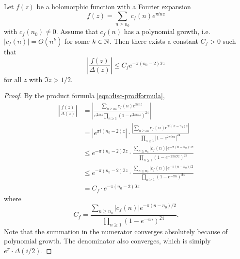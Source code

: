 \begin{lemma}\label{lemma:mod-div-disc-bound}\leanok
Let $f(z)$ be a holomorphic function with a Fourier expansion
\begin{equation}
    f(z) = \sum_{n \ge n_0} c_f(n) e^{\pi i n z}
\end{equation}
with $c_f(n_0) \ne 0$.
Assume that $c_f(n)$ has a polynomial growth, i.e. $|c_f(n)| = O(n^k)$ for some $k \in \mathbb{N}$.
Then there exists a constant $C_f > 0$ such that
\begin{equation}
    \left|\frac{f(z)}{\Delta(z)}\right| \le C_f e^{-\pi (n_0 - 2) \Im z}
\end{equation}
for all $z$ with $\Im z > 1/2$.
\end{lemma}
\begin{proof}\leanok
By the product formula \eqref{eqn:disc-prodformula},
\begin{align}
    \left|\frac{f(z)}{\Delta(z)}\right| &= \left|\frac{\sum_{n \ge n_0} c_f(n) e^{\pi i n z}}{e^{2 \pi i z}\prod_{n \ge 1} (1 - e^{2\pi i n z})^{24}}\right| \\
    &= |e^{\pi i (n_0 - 2)z}| \cdot \frac{|\sum_{n \ge n_0} c_f(n) e^{\pi i (n - n_0) z}|}{\prod_{n \ge 1} |1 - e^{2\pi i n z}|^{24}} \\
    &\le e^{-\pi (n_0 - 2) \Im z} \cdot \frac{\sum_{n \ge n_0} |c_f(n)| e^{-\pi (n - n_0) \Im z}}{\prod_{n \ge 1} (1 - e^{- 2\pi n \Im z})^{24}} \\
    &\le e^{-\pi (n_0 - 2) \Im z} \cdot \frac{\sum_{n \ge n_0} |c_f(n)| e^{-\pi (n - n_0) / 2}}{\prod_{n \ge 1} (1 - e^{-\pi n})^{24}} \\
    &= C_f \cdot e^{-\pi (n_0 - 2) \Im z}
\end{align}
where
\begin{equation}
    C_f = \frac{\sum_{n \ge n_0} |c_f(n)| e^{-\pi (n - n_0) / 2}}{\prod_{n \ge 1} (1 - e^{-\pi n})^{24}}.
\end{equation}
Note that the summation in the numerator converges absolutely because of polynomial growth.
The denominator also converges, which is simiply $e^{\pi} \cdot \Delta(i/2)$.
\end{proof}

